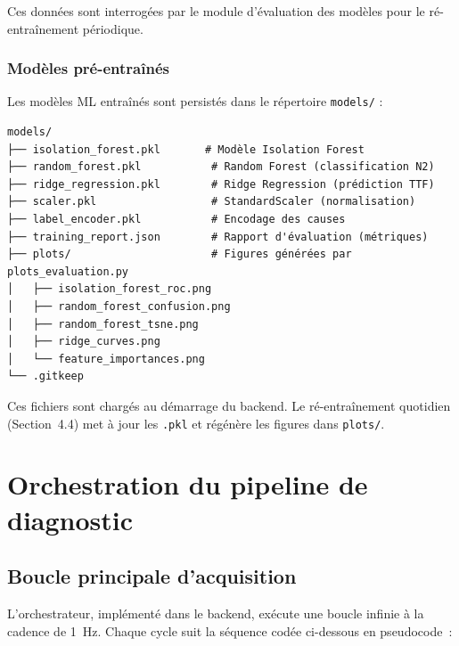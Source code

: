 Ces données sont interrogées par le module d'évaluation des modèles pour le ré-entraînement périodique.

\subsubsection{Modèles pré-entraînés}

Les modèles ML entraînés sont persistés dans le répertoire \texttt{models/} :

\begin{center}
\begin{minipage}{0.70\textwidth}
\begin{verbatim}
models/
├── isolation_forest.pkl       # Modèle Isolation Forest
├── random_forest.pkl           # Random Forest (classification N2)
├── ridge_regression.pkl        # Ridge Regression (prédiction TTF)
├── scaler.pkl                  # StandardScaler (normalisation)
├── label_encoder.pkl           # Encodage des causes
├── training_report.json        # Rapport d'évaluation (métriques)
├── plots/                      # Figures générées par plots_evaluation.py
│   ├── isolation_forest_roc.png
│   ├── random_forest_confusion.png
│   ├── random_forest_tsne.png
│   ├── ridge_curves.png
│   └── feature_importances.png
└── .gitkeep
\end{verbatim}
\end{minipage}
\end{center}

Ces fichiers sont chargés au démarrage du backend. Le ré-entraînement quotidien (Section~4.4) met à jour les \texttt{.pkl} et régénère les figures dans \texttt{plots/}.

\section{Orchestration du pipeline de diagnostic}

\subsection{Boucle principale d'acquisition}

L'orchestrateur, implémenté dans le backend, exécute une boucle infinie à la cadence de 1~Hz. Chaque cycle suit la séquence codée ci-dessous en pseudocode~:

